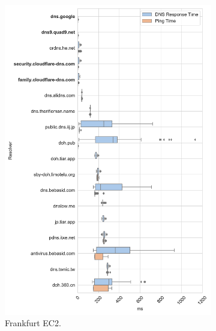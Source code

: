 \begin{figure}[h!]
\begin{subfigure}[b]{0.4\textwidth}
\includegraphics[width=\textwidth]{figures/frankfurt_asia.pdf}
    \caption{Frankfurt EC2.}
\end{subfigure}
%
\begin{subfigure}[b]{0.4\textwidth}

\end{subfigure}
\end{figure}
